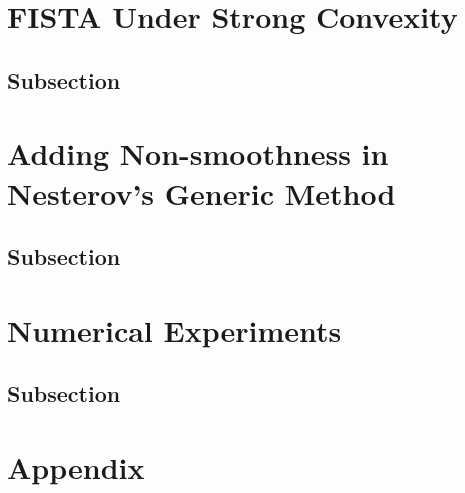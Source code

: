 \documentclass[]{article}
\theoremstyle{definition}
\numberwithin{equation}{subsection}
\begin{document}
\section{FISTA Under Strong Convexity}\label{sec:fista_strong_convexity}
    
    \subsection{Subsection}


\section{Adding Non-smoothness in Nesterov's Generic Method}
    \subsection{Subsection}
\section{Numerical Experiments}\label{sec:numerics}
    \subsection{Subsection}
\appendix

\section{Appendix} 
    





\end{document}
